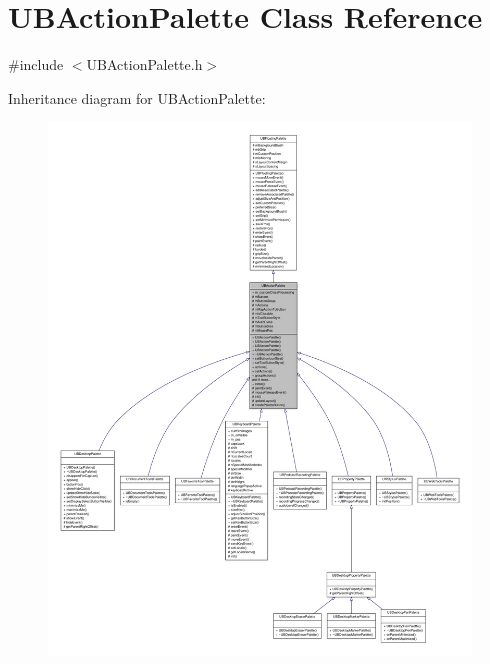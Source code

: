 \hypertarget{class_u_b_action_palette}{\section{U\-B\-Action\-Palette Class Reference}
\label{de/dc5/class_u_b_action_palette}
}


{\ttfamily \#include $<$U\-B\-Action\-Palette.\-h$>$}



Inheritance diagram for U\-B\-Action\-Palette\-:
\nopagebreak
\begin{figure}[H]
\begin{center}
\leavevmode
\includegraphics[width=350pt]{da/d60/class_u_b_action_palette__inherit__graph}
\end{center}
\end{figure}


